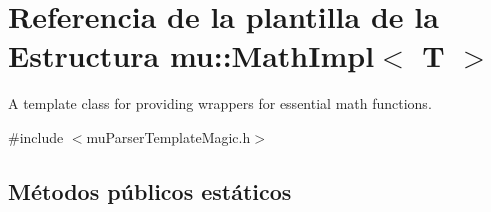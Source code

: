 \hypertarget{structmu_1_1_math_impl}{}\section{Referencia de la plantilla de la Estructura mu\+:\+:Math\+Impl$<$ T $>$}
\label{structmu_1_1_math_impl}


A template class for providing wrappers for essential math functions.  




{\ttfamily \#include $<$mu\+Parser\+Template\+Magic.\+h$>$}

\subsection*{Métodos públicos estáticos}
